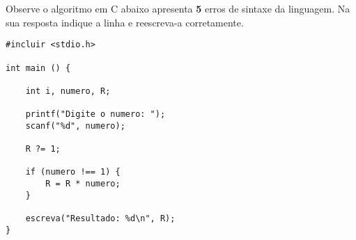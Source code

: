 
\question[10]

Observe o algoritmo em C abaixo apresenta \textbf{5} erros de sintaxe da linguagem. Na sua resposta indique a linha e reescreva-a corretamente.

\begin{lstlisting}
#incluir <stdio.h>

int main () {
	
	int i, numero, R;
	
	printf("Digite o numero: ");
	scanf("%d", numero);
	
	R ?= 1;
	
	if (numero !== 1) {
		R = R * numero;
	}
	
	escreva("Resultado: %d\n", R);
}
\end{lstlisting}

